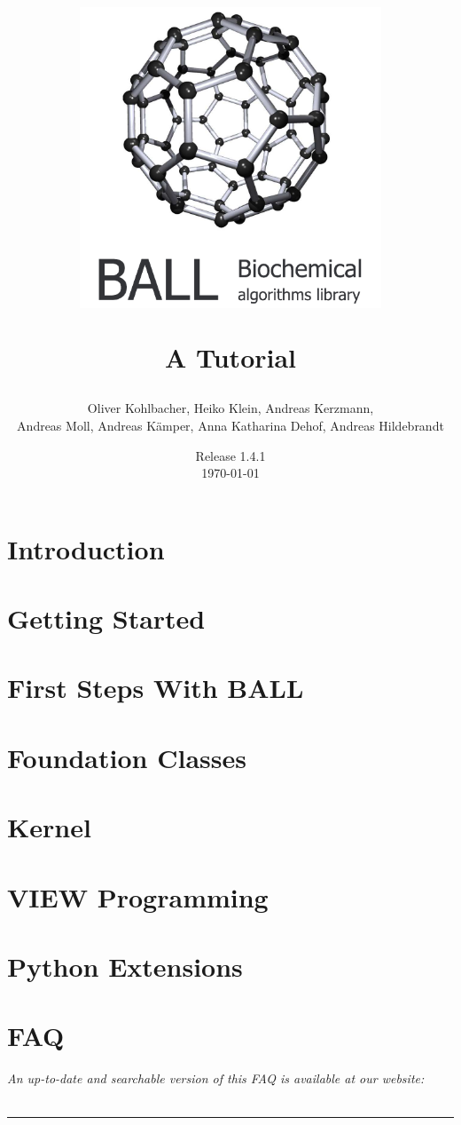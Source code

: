 \documentclass[12pt,twoside]{report}
\author{
  Oliver Kohlbacher, Heiko Klein, Andreas Kerzmann, \\
  Andreas Moll, Andreas K\"{a}mper, Anna Katharina Dehof, Andreas Hildebrandt
}
\title{
  \begin{center}
    \includegraphics[width=9cm]{logo}
  \end{center}
  \vspace{1cm}
  \Large A Tutorial
}
\date{
  Release 1.4.1\\
  \today
}
\begin{document}
\setlength{\headheight}{14.5pt}
\setcounter{page}{1}
\maketitle
\cleardoublepage

\tableofcontents
\clearpage

\setcounter{page}{1}


\chapter{Introduction}
\label{chapter:introduction}



\chapter{Getting Started}
\label{chapter:getting-started}




\chapter{First Steps With BALL}
\label{chapter:first-steps}




\chapter{Foundation Classes}
\label{chapter:foundation-classes}




\chapter{Kernel}
\label{chapter:kernel}


\chapter{VIEW Programming}
\label{chapter:view-programming}


\chapter{Python Extensions}
\label{chapter:python}


\chapter{FAQ}
\label{chapter:faq}
\newpage
\noindent
{\it An up-to-date and searchable version of this FAQ is available at our 
website:\\
}\\
\hspace{1mm}
\rule{\textwidth}{0.1pt}
\hspace{3mm}

\end{document}
